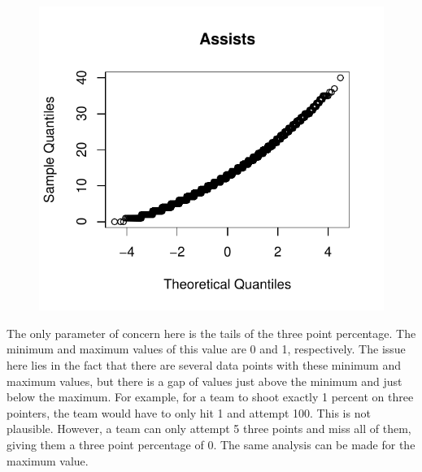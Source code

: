 \documentclass[]{scrartcl}
\begin{document}
\begin{figure}[H]
	\includegraphics[scale=.6]{assnorm.pdf}
\end{figure}
The only parameter of concern here is the tails of the three point percentage. The minimum and maximum values of this value are 0 and 1, respectively. The issue here lies in the fact that there are several data points with these minimum and maximum values, but there is a gap of values just above the minimum and just below the maximum. For example, for a team to shoot exactly 1 percent on three pointers, the team would have to only hit 1 and attempt 100. This is not plausible. However, a team can only attempt 5 three points and miss all of them, giving them a three point percentage of 0. The same analysis can be made for the maximum value. 
\end{document}
